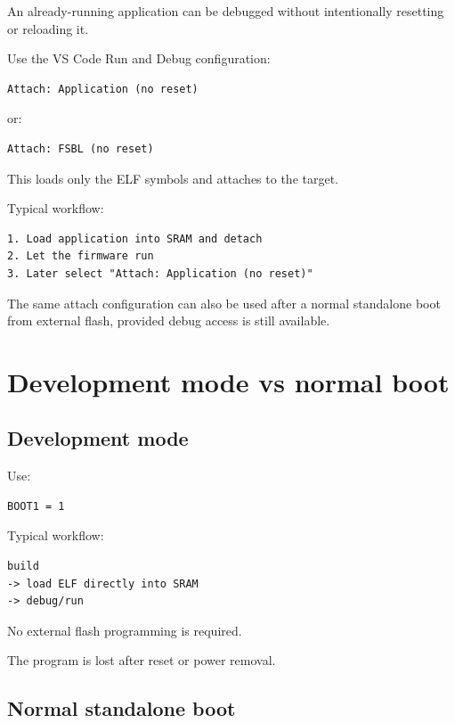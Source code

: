 \documentclass[10pt,a4paper,oneside]{report}
\begin{document}
An already-running application can be debugged without intentionally resetting or reloading it.

Use the VS Code Run and Debug configuration:

\begin{verbatim}
Attach: Application (no reset)
\end{verbatim}

or:

\begin{verbatim}
Attach: FSBL (no reset)
\end{verbatim}

This loads only the ELF symbols and attaches to the target.

Typical workflow:

\begin{verbatim}
1. Load application into SRAM and detach
2. Let the firmware run
3. Later select "Attach: Application (no reset)"
\end{verbatim}

The same attach configuration can also be used after a normal standalone boot from external flash, provided debug access is still available.

\section{Development mode vs normal boot}\label{wiki-getting-started-build-flash-debug--11-development-mode-vs-normal-boot}

\subsection{Development mode}\label{wiki-getting-started-build-flash-debug--development-mode}

Use:

\begin{verbatim}
BOOT1 = 1
\end{verbatim}

Typical workflow:

\begin{verbatim}
build
-> load ELF directly into SRAM
-> debug/run
\end{verbatim}

No external flash programming is required.

The program is lost after reset or power removal.

\subsection{Normal standalone boot}\label{wiki-getting-started-build-flash-debug--normal-standalone-boot}
\end{document}
